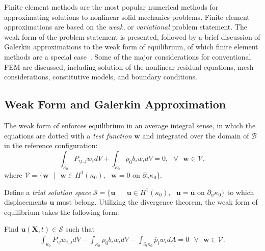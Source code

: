 Finite element methods are the most popular numerical methods for approximating solutions to nonlinear solid mechanics problems. Finite element approximations are based on the \textit{weak}, or \textit{variational} problem statement. The weak form of the problem statement is presented, followed by a brief discussion of Galerkin approximations to the weak form of equilibrium, of which finite element methods are a special case~\cite{rashid_2017}. Some of the major considerations for conventional FEM are discussed, including solution of the nonlinear residual equations, mesh considerations, constitutive models, and boundary conditions.

\subsection{Weak Form and Galerkin Approximation}

The weak form of  enforces equilibrium in an average integral sense, in which the equations are dotted with a \textit{test function} $\bm{w}$ and integrated over the domain of $\mathcal{B}$ in the reference configuration:
\begin{equation}
\int_{\kappa_0}{P_{ij,j}}w_idV + \int_{\kappa_0}\rho_0b_iw_idV = 0, \text{\ \ } \forall \text{\ \ } \bm{w} \in \mathcal{V},
\end{equation}
where $\mathcal{V} = \lbrace\bm{w} \text{\ }|\text{\ } \bm{w} \in H^1(\kappa_0), \text{\ }\bm{w} = 0 \text{\ \ on\ } \partial_u\kappa_0\rbrace$.

Define a \textit{trial solution space} $\mathcal{S} = \lbrace\bm{u} \text{\ }|\text{\ } \bm{u} \in H^1(\kappa_0), \text{\ }\bm{u} = \overline{\bm{u}} \text{\ \ on\ } \partial_u\kappa_0\rbrace$  to which displacements $\bm{u}$ must belong. Utilizing the divergence theorem, the weak form of equilibrium takes the following form:

Find $\bm{u}(\bm{X},t) \in \mathcal{S}$ such that
\begin{gather}
\int_{\kappa_0}P_{ij}w_{i,j}dV - \int_{\kappa_0}\rho_0b_iw_idV - \int_{\partial_t\kappa_0}\overline{p}_iw_idA = 0 \text{\ \ } \forall \text{\ \ } \bm{w} \in \mathcal{V}.
\end{gather}

